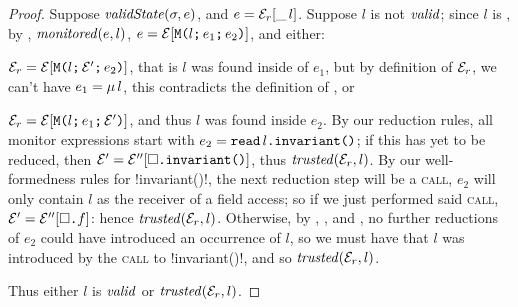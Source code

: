 \begin{proof}
\noindent Suppose $\mathit{validState}(\sigma, e)$, and $e = \mathcal{E}_r{}[\_\,l]$. Suppose $l$ is not $\mathit{valid}$; since $l$ is \reach, by , $\mathit{monitored}(e,l)$, $e = \mathcal{E}[\texttt{M}\texttt{(}{}l\texttt{;}\,e_1\texttt{;}\,e_2\texttt{)}]$, and either:
\begin{iitemize}
	\item $\mathcal{E}_r{} = \mathcal{E}[\texttt{M}\texttt{(}{}l\texttt{;}\,\mathcal{E}'\texttt{;}\,e_2\texttt{)}]$, that is $l$ was found inside of $e_1$, but by definition of $\mathcal{E}_r{}$, we can't have $e_1 = \mu\,l$, this contradicts the definition of \mony, or
	\item $\mathcal{E}_r{} = \mathcal{E}[\texttt{M}\texttt{(}{}l\texttt{;}\,e_1\texttt{;}\,\mathcal{E}'\texttt{)}]$, and thus $l$ was found inside $e_2$. By our reduction rules, all monitor expressions start with $e_2=\texttt{read}\,l\texttt{.} \texttt{invariant}\texttt{(}\texttt{)}$; if this has yet to be reduced, then $\mathcal{E}' = \mathcal{E}''[\square\texttt{.} \texttt{invariant}\texttt{(}\texttt{)}]$, thus $\mathit{trusted}(\mathcal{E}_r{}, l)$. By our well-formedness rules for \Q!invariant()!, the next reduction step will be a \textsc{call}, $e_2$ will only contain $l$ as the receiver of a field access; so if we just performed said \textsc{call}, $\mathcal{E}' = \mathcal{E}''[\square\texttt{.} f]$: hence $\mathit{trusted}(\mathcal{E}_r{}, l)$. Otherwise, by , , and \RCR, no further reductions of $e_2$ could have introduced an occurrence of $l$, so we must have that $l$ was introduced by the \textsc{call} to \Q!invariant()!, and so $\mathit{trusted}(\mathcal{E}_r{}, l)$.
\end{iitemize}
Thus either $l$ is $\mathit{valid}$ or $\mathit{trusted}(\mathcal{E}_r{}, l)$.
\end{proof}















